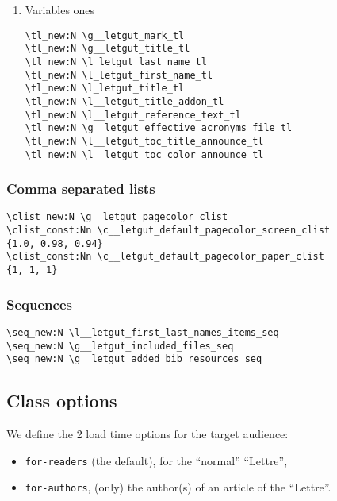 \documentclass{letgut}
\begin{document}
\begin{enumerate}
\item Variables ones
\label{ImplementationDeclarationsTokenlistsVariablesones-pxcg55h0jlj0}
\begin{lstlisting}
\tl_new:N \g__letgut_mark_tl
\tl_new:N \g__letgut_title_tl
\tl_new:N \l_letgut_last_name_tl
\tl_new:N \l_letgut_first_name_tl
\tl_new:N \l_letgut_title_tl
\tl_new:N \l__letgut_title_addon_tl
\tl_new:N \l__letgut_reference_text_tl
\tl_new:N \g__letgut_effective_acronyms_file_tl
\tl_new:N \l__letgut_toc_title_announce_tl
\tl_new:N \l__letgut_toc_color_announce_tl
\end{lstlisting}
\end{enumerate}

\subsubsection{Comma separated lists}
\label{ImplementationDeclarationsCommaseparatedlists-vhdg55h0jlj0}
\begin{lstlisting}
\clist_new:N \g__letgut_pagecolor_clist
\clist_const:Nn \c__letgut_default_pagecolor_screen_clist
{1.0, 0.98, 0.94}
\clist_const:Nn \c__letgut_default_pagecolor_paper_clist
{1, 1, 1}
\end{lstlisting}

\subsubsection{Sequences}
\label{ImplementationDeclarationsSequences-m2eg55h0jlj0}
\begin{lstlisting}
\seq_new:N \l__letgut_first_last_names_items_seq
\seq_new:N \g__letgut_included_files_seq
\seq_new:N \g__letgut_added_bib_resources_seq
\end{lstlisting}

\subsection{Class options}
\label{ImplementationClassoptions-4meg55h0jlj0}
We define the 2 load time options for the target audience:

\begin{itemize}
\item \lstinline+for-readers+ (the default), for the “normal” “Lettre”,
\item \lstinline+for-authors+, (only) the author(s) of an article of the “Lettre”.
\end{itemize}
\end{document}
